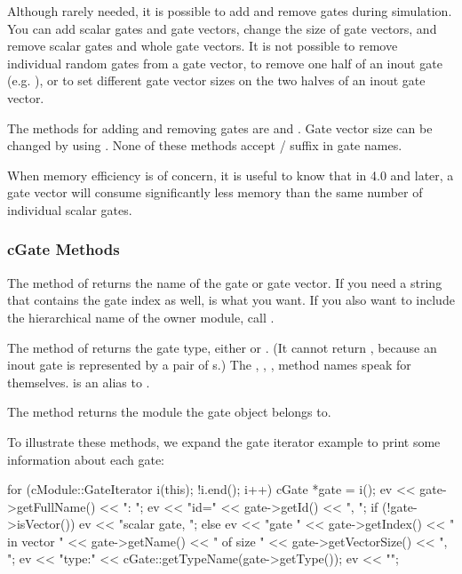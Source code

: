 Although rarely needed, it is possible to add and remove gates during
simulation. You can add scalar gates and gate vectors, change the size of
gate vectors, and remove scalar gates and whole gate vectors.
It is not possible to remove individual random gates from a gate vector,
to remove one half of an inout gate (e.g. ), or to set
different gate vector sizes on the two halves of an inout gate vector.

The  methods for adding and removing gates are
 and .
Gate vector size can be changed by using .
None of these methods accept  /  suffix in gate names.

\begin{note}
    When memory efficiency is of concern, it is useful to know that
    in {\opp} 4.0 and later, a gate vector will consume significantly less
    memory than the same number of individual scalar gates.
\end{note}


\subsubsection{cGate Methods}

The  method of  returns the name of the
gate or gate vector. If you need a string that contains the gate index
as well,  is what you want. If you also want to
include the hierarchical name of the owner module, call .

The  method of  returns the gate type,
either  or . (It cannot return
, because an inout gate is represented by a pair
of s.) The , ,
,  method names speak for themselves.
 is an alias to .

The  method returns the module the gate object
belongs to.

To illustrate these methods, we expand the gate iterator example
to print some information about each gate:

\begin{cpp}
for (cModule::GateIterator i(this); !i.end(); i++) {
    cGate *gate = i();
    ev << gate->getFullName() << ": ";
    ev << "id=" << gate->getId() << ", ";
    if (!gate->isVector())
        ev << "scalar gate, ";
    else
        ev << "gate " << gate->getIndex()
           << " in vector " << gate->getName()
           << " of size " << gate->getVectorSize() << ", ";
    ev << "type:" << cGate::getTypeName(gate->getType());
    ev << "\n";
}
\end{cpp}

